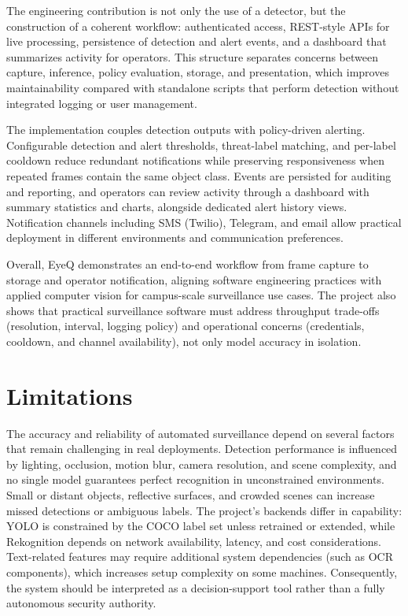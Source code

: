 \documentclass[10pt,openany]{report}
\begin{document}
\begin{sloppypar}
{{{\begin{sloppypar}
The engineering contribution is not only the use of a detector, but the construction of a coherent workflow: authenticated access, REST-style APIs for live processing, persistence of detection and alert events, and a dashboard that summarizes activity for operators. This structure separates concerns between capture, inference, policy evaluation, storage, and presentation, which improves maintainability compared with standalone scripts that perform detection without integrated logging or user management.

The implementation couples detection outputs with policy-driven alerting. Configurable detection and alert thresholds, threat-label matching, and per-label cooldown reduce redundant notifications while preserving responsiveness when repeated frames contain the same object class. Events are persisted for auditing and reporting, and operators can review activity through a dashboard with summary statistics and charts, alongside dedicated alert history views. Notification channels including SMS (Twilio), Telegram, and email allow practical deployment in different environments and communication preferences.

Overall, EyeQ demonstrates an end-to-end workflow from frame capture to storage and operator notification, aligning software engineering practices with applied computer vision for campus-scale surveillance use cases. The project also shows that practical surveillance software must address throughput trade-offs (resolution, interval, logging policy) and operational concerns (credentials, cooldown, and channel availability), not only model accuracy in isolation.

\section{Limitations}

The accuracy and reliability of automated surveillance depend on several factors that remain challenging in real deployments. Detection performance is influenced by lighting, occlusion, motion blur, camera resolution, and scene complexity, and no single model guarantees perfect recognition in unconstrained environments. Small or distant objects, reflective surfaces, and crowded scenes can increase missed detections or ambiguous labels. The project’s backends differ in capability: YOLO is constrained by the COCO label set unless retrained or extended, while Rekognition depends on network availability, latency, and cost considerations. Text-related features may require additional system dependencies (such as OCR components), which increases setup complexity on some machines. Consequently, the system should be interpreted as a decision-support tool rather than a fully autonomous security authority.


\end{sloppypar}}}}
\end{sloppypar}
\end{document}
